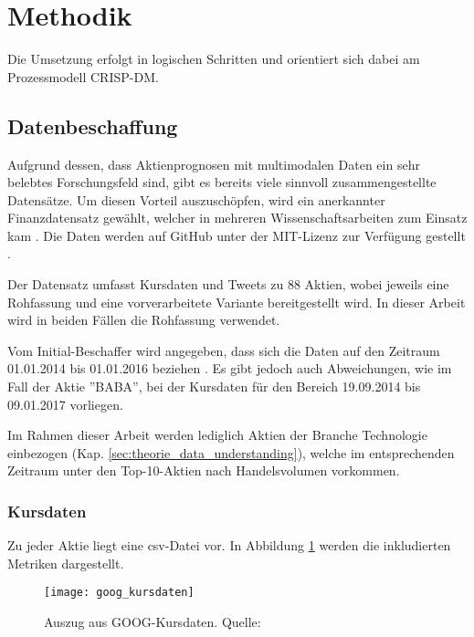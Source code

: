 \newpage
\section{Methodik}
Die Umsetzung erfolgt in logischen Schritten und orientiert sich dabei am Prozessmodell \ac{CRISP-DM}.  

\subsection{Datenbeschaffung}\label{sec:data_ingestion}
Aufgrund dessen, dass Aktienprognosen mit multimodalen Daten ein sehr belebtes Forschungsfeld sind, gibt es bereits viele sinnvoll zusammengestellte Datensätze. Um diesen Vorteil auszuschöpfen, wird ein anerkannter Finanzdatensatz gewählt, welcher in mehreren Wissenschaftsarbeiten zum Einsatz kam \autocite{xu2018StockMovement}\autocite{Xu2020StockMovement}\autocite{zhang2022transformer}. Die Daten werden auf GitHub unter der MIT-Lizenz zur Verfügung gestellt \autocite{website:stocknet-dataset}. 

Der Datensatz umfasst Kursdaten und Tweets zu 88 Aktien, wobei jeweils eine Rohfassung und eine vorverarbeitete Variante bereitgestellt wird. In dieser Arbeit wird in beiden Fällen die Rohfassung verwendet. 

Vom Initial-Beschaffer wird angegeben, dass sich die Daten auf den Zeitraum 01.01.2014 bis 01.01.2016 beziehen \autocite[Kap. 3]{xu2018StockMovement}.
Es gibt jedoch auch Abweichungen, wie im Fall der Aktie ''BABA'', bei der Kursdaten für den Bereich 19.09.2014 bis 09.01.2017 vorliegen.

Im Rahmen dieser Arbeit werden lediglich Aktien der Branche Technologie einbezogen (Kap. \ref{sec:theorie_data_understanding}), welche im entsprechenden Zeitraum unter den Top-10-Aktien nach Handelsvolumen vorkommen. 

\subsubsection*{Kursdaten}\label{sec:data_ingestion_stockdata}
Zu jeder Aktie liegt eine \ac{csv}-Datei vor. In Abbildung \ref{fig:goog_kursdaten} werden die inkludierten Metriken dargestellt.
\newpage
\begin{figure}[H]
	\texttt{[image: goog\_kursdaten]}
	\caption[Auszug aus GOOG-Kursdaten]{Auszug aus GOOG-Kursdaten. Quelle: \autocite{website:stocknet-dataset}}
	\label{fig:goog_kursdaten}
\end{figure}
 

